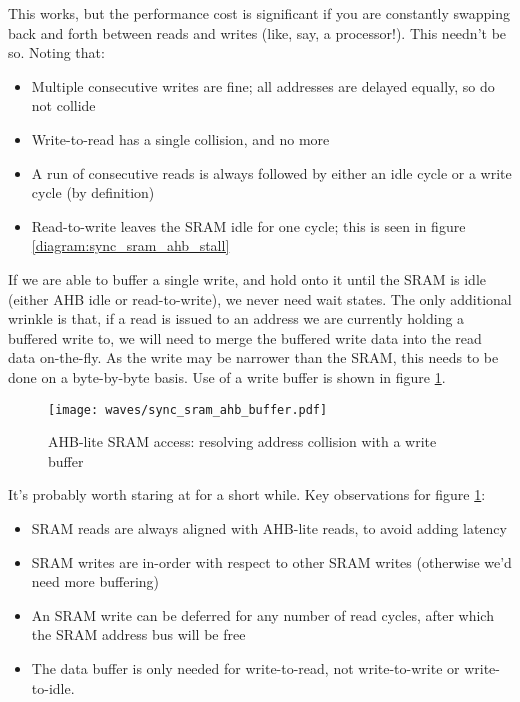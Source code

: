 This works, but the performance cost is significant if you are constantly swapping back and forth between reads and writes (like, say, a processor!). This needn't be so. Noting that:

\begin{itemize}
	\item Multiple consecutive writes are fine; all addresses are delayed equally, so do not collide
	\item Write-to-read has a single collision, and no more
	\item A run of consecutive reads is always followed by either an idle cycle or a write cycle (by definition)
	\item Read-to-write leaves the SRAM idle for one cycle; this is seen in figure \ref{diagram:sync_sram_ahb_stall}
\end{itemize}

If we are able to buffer a single write, and hold onto it until the SRAM is idle (either AHB idle or read-to-write), we never need wait states. The only additional wrinkle is that, if a read is issued to an address we are currently holding a buffered write to, we will need to merge the buffered write data into the read data on-the-fly. As the write may be narrower than the SRAM, this needs to be done on a byte-by-byte basis. Use of a write buffer is shown in figure \ref{diagram:sync_sram_ahb_buffer}.

\begin{figure}[H]
\centering
\caption{AHB-lite SRAM access: resolving address collision with a write buffer}
\texttt{[image: waves/sync\_sram\_ahb\_buffer.pdf]}
\label{diagram:sync_sram_ahb_buffer}
\end{figure}

It's probably worth staring at for a short while. Key observations for figure \ref{diagram:sync_sram_ahb_buffer}:

\begin{itemize}
	\item SRAM reads are always aligned with AHB-lite reads, to avoid adding latency
	\item SRAM writes are in-order with respect to other SRAM writes (otherwise we'd need more buffering)
	\item An SRAM write can be deferred for any number of read cycles, after which the SRAM address bus will be free
	\item The data buffer is only needed for write-to-read, not write-to-write or write-to-idle.
\end{itemize}


